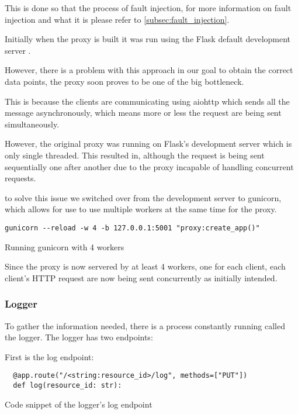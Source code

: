 This is done so that the process of fault injection, for more information on fault injection and what it is
please refer to \ref{subsec:fault_injection}.

Initially when the proxy is built it was run using the Flask default development 
server \cite{flask_dev_server}. 

However, there is a problem with this approach in our goal to obtain the correct 
data points, the proxy soon proves to be one of the big bottleneck.

This is because the clients are communicating using aiohttp which sends all the 
message asynchronously, which means more or less the request are being sent 
simultaneously.

However, the original proxy was running on Flask's development server which is 
only single threaded. This resulted in, although the request is being sent sequentially
one after another due to the proxy incapable of handling concurrent requests.

to solve this issue we switched over from the development server to gunicorn,
which allows for use to use multiple workers at the same time for the proxy.

\begin{listing}[!ht]
  \begin{verbatim}
gunicorn --reload -w 4 -b 127.0.0.1:5001 "proxy:create_app()"
  \end{verbatim}
  \caption{Running gunicorn with 4 workers}
\end{listing}

Since the proxy is now servered by at least 4 workers, one for each client, each
client's HTTP request are now being sent concurrently as initially intended.

\subsubsection{Logger}

To gather the information needed, there is a process constantly running called 
the logger. The logger has two endpoints:

First is the log endpoint: 

\begin{listing}[!ht]
  \begin{verbatim}
  @app.route("/<string:resource_id>/log", methods=["PUT"])
  def log(resource_id: str):
  \end{verbatim}
  \caption{Code snippet of the logger's log endpoint}
  \label{code:logger_log}
\end{listing}

